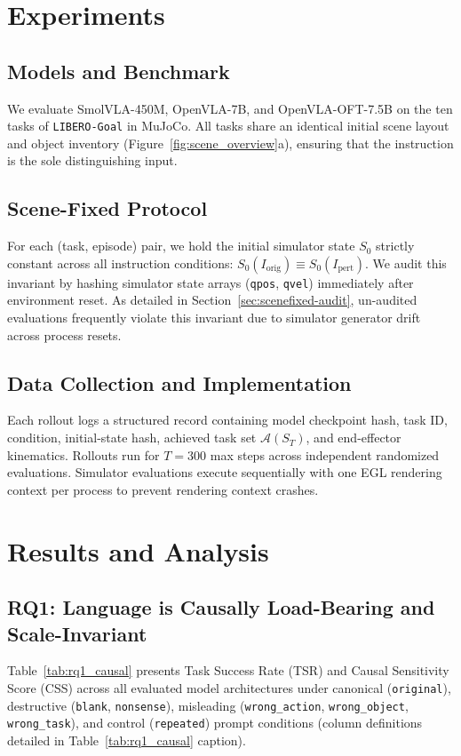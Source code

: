 \documentclass[11pt]{article}
\begin{document}
\section{Experiments}
\label{sec:experiments}

\subsection{Models and Benchmark}
We evaluate SmolVLA-450M, OpenVLA-7B, and OpenVLA-OFT-7.5B on the ten tasks of \texttt{LIBERO-Goal} in MuJoCo. All tasks share an identical initial scene layout and object inventory (Figure~\ref{fig:scene_overview}a), ensuring that the instruction is the sole distinguishing input.

\subsection{Scene-Fixed Protocol}
For each (task, episode) pair, we hold the initial simulator state $S_0$ strictly constant across all instruction conditions: $S_0(I_{\text{orig}}) \equiv S_0(I_{\text{pert}})$. We audit this invariant by hashing simulator state arrays (\texttt{qpos}, \texttt{qvel}) immediately after environment reset. As detailed in Section~\ref{sec:scenefixed-audit}, un-audited evaluations frequently violate this invariant due to simulator generator drift across process resets.

\subsection{Data Collection and Implementation}
Each rollout logs a structured record containing model checkpoint hash, task ID, condition, initial-state hash, achieved task set $\mathcal{A}(S_T)$, and end-effector kinematics. Rollouts run for $T=300$ max steps across independent randomized evaluations. Simulator evaluations execute sequentially with one EGL rendering context per process to prevent rendering context crashes.

\section{Results and Analysis}

\subsection{RQ1: Language is Causally Load-Bearing and Scale-Invariant}
Table~\ref{tab:rq1_causal} presents Task Success Rate (TSR) and Causal Sensitivity Score (CSS) across all evaluated model architectures under canonical (\texttt{original}), destructive (\texttt{blank}, \texttt{nonsense}), misleading (\texttt{wrong\_action}, \texttt{wrong\_object}, \texttt{wrong\_task}), and control (\texttt{repeated}) prompt conditions (column definitions detailed in Table~\ref{tab:rq1_causal} caption).
\end{document}
